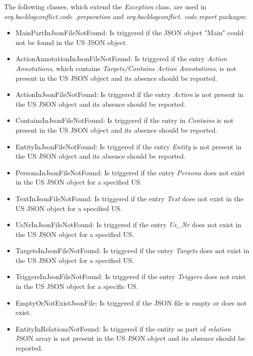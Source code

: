 The following classes, which extend the \textit{Exception} class, are used in \textit{org.backlogconflict.code .preparation} and \textit{org.backlogconflict. code.report} packages:
\begin{itemize}
	\item MainPartInJsonFileNotFound: Is triggered if the JSON object "Main" could not be found in the US JSON object.
	
	\item ActionAnnotationInJsonFileNotFound: Is triggered if the entry \textit{Action Annotations}, which contains \textit{Targets/Contains Action Annotations}, is not present in the US JSON object and its absence should be reported.
	
	\item ActionInJsonFileNotFound: Is triggered if the entry \textit{Action} is not present in the US JSON object and its absence should be reported.
		
	\item ContainsInJsonFileNotFound: Is triggered if the entry in \textit{Contains} is not present in the US JSON object and its absence should be reported.
	
	\item EntityInJsonFileNotFound: Is triggered if the entry \textit{Entity} is not present in the US JSON object and its absence should be reported.
	
	\item PersonaInJsonFileNotFound: Is triggered if the entry \textit{Persona} does not exist in the US JSON object for a specified US.
	
	\item TextInJsonFileNotFound: Is triggered if the entry \textit{Text} does not exist in the US JSON object for a specified US. 
	
	\item UsNrInJsonFileNotFound: Is triggered if the entry \textit{Us\_Nr} does not exist in the US JSON object for a specified US.
	
	\item TargetsInJsonFileNotFound: Is triggered if the entry \textit{Targets} does not exist in the US JSON object for a specified US.
	
	\item TriggersInJsonFileNotFound: Is triggered if the entry \textit{Triggers} does not exist in the US JSON object for a specific US.
	
	\item EmptyOrNotExistJsonFile: Is triggered if the JSON file is empty or does not exist.
	
	\item EntityInRelationsNotFound: Is triggered if the entity as part of \textit{relation} JSON array is not present in the US JSON object and its absence should be reported.
	
\end{itemize}

